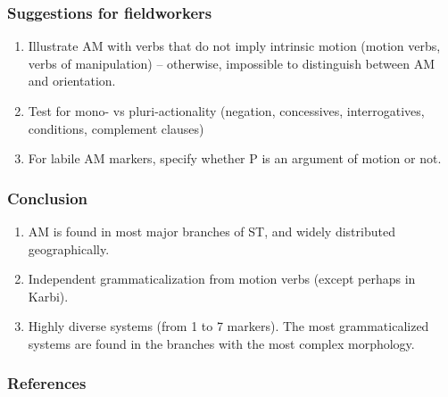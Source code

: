 \documentclass[xcolor=table]{beamer}
\begin{document}
\begin{frame} 
\frametitle{Suggestions for fieldworkers}

\begin{enumerate}
\item Illustrate AM with verbs that do not imply intrinsic motion (motion verbs, verbs of manipulation) -- otherwise, impossible to distinguish between AM and orientation.
\item Test for mono- vs pluri-actionality (negation, concessives, interrogatives, conditions, complement clauses)
\item For labile AM markers, specify whether P is an argument of motion or not.
\end{enumerate}

\end{frame}  

\begin{frame} 
\frametitle{Conclusion}
\begin{enumerate}
\item<1->  AM is found in most major branches of ST, and widely distributed geographically.
\item<2->  Independent grammaticalization from motion verbs (except perhaps in Karbi).
\item<3->  Highly diverse systems  (from 1 to 7 markers). The most grammaticalized systems are found in the branches with the most complex morphology.
\end{enumerate}
\end{frame}  

\begin{frame} 
\frametitle{References} 
\tiny


\end{frame}  
\end{document}
